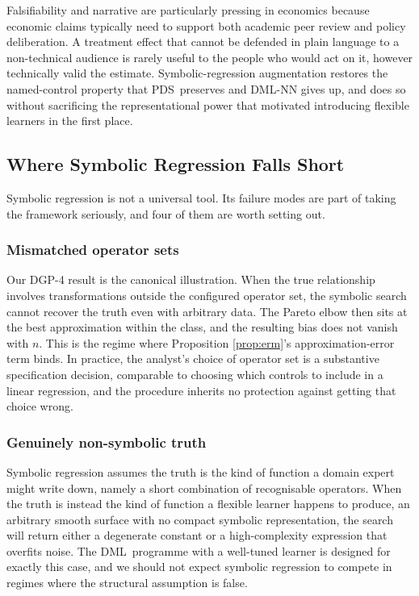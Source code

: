 \documentclass[11pt, a4paper]{article}
\theoremstyle{plain}
\theoremstyle{definition}
\theoremstyle{remark}
\newcommand{\pds}{\textsc{PDS}}
\newcommand{\dml}{\textsc{DML}}
\begin{document}
Falsifiability and narrative are particularly pressing in
economics because economic claims typically need to support
both academic peer review and policy deliberation. A treatment
effect that cannot be defended in plain language to a
non-technical audience is rarely useful to the people who would
act on it, however technically valid the estimate.
Symbolic-regression augmentation restores the named-control
property that \pds\ preserves and \dml-NN gives up, and does so
without sacrificing the representational power that motivated
introducing flexible learners in the first place.

\subsection{Where Symbolic Regression Falls Short}

Symbolic regression is not a universal tool. Its failure modes
are part of taking the framework seriously, and four of them
are worth setting out.

\subsubsection{Mismatched operator sets}

Our DGP-4 result is the
canonical illustration. When the true relationship involves
transformations outside the configured operator set, the
symbolic search cannot recover the truth even with arbitrary
data. The Pareto elbow then sits at the best approximation
within the class, and the resulting bias does not vanish with
$n$. This is the regime where Proposition \ref{prop:erm}'s
approximation-error term binds. In practice, the analyst's
choice of operator set is a substantive specification decision,
comparable to choosing which controls to include in a linear
regression, and the procedure inherits no protection against
getting that choice wrong.

\subsubsection{Genuinely non-symbolic truth}

Symbolic regression assumes the truth is the kind of function a domain expert might
write down, namely a short combination of recognisable
operators. When the truth is instead the kind of function a
flexible learner happens to produce, an arbitrary smooth
surface with no compact symbolic representation, the search
will return either a degenerate constant or a high-complexity
expression that overfits noise. The \dml\ programme with a
well-tuned learner is designed for exactly this case, and we
should not expect symbolic regression to compete in regimes
where the structural assumption is false.
\end{document}
